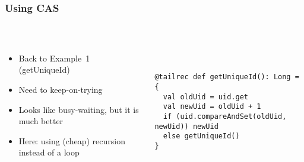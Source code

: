 \documentclass[aspectratio=169]{beamer}
\begin{document}
\begin{frame}[fragile]\frametitle{Using CAS}
~\\[-8mm]
\begin{columns}
\begin{column}{0.48\textwidth}
\begin{itemize}
  \item Back to Example~1 (getUniqueId)
  \item Need to keep-on-trying
  \item Looks like busy-waiting, but it is much better
  \item Here: using (cheap) recursion instead of a loop
\end{itemize}
\end{column}
\begin{column}{0.54\textwidth}
~\\
\begin{lstlisting}[emph={execute,sleep,log,compareAndSet,synchronized}]
@tailrec def getUniqueId(): Long = {
  val oldUid = uid.get
  val newUid = oldUid + 1
  if (uid.compareAndSet(oldUid, newUid)) newUid
  else getUniqueId()
}\end{lstlisting}
\end{column}
\end{columns}
\end{frame}
\end{document}
